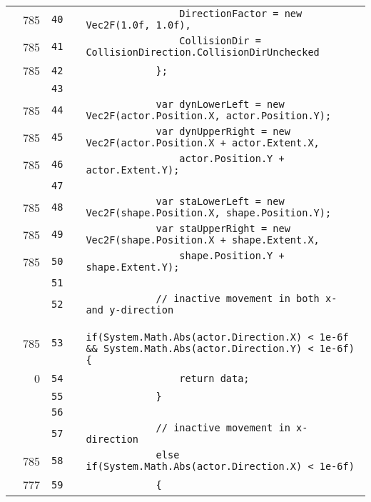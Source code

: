 \documentclass[a4paper,landscape,10pt]{article}
\begin{document}
\begin{longtable}[l]{lrrll}
\cellcolor{green} & 785 & \verb~40~ & & \verb~                DirectionFactor = new Vec2F(1.0f, 1.0f),~\\
\cellcolor{green} & 785 & \verb~41~ & & \verb~                CollisionDir = CollisionDirection.CollisionDirUnchecked~\\
\cellcolor{green} & 785 & \verb~42~ & & \verb~            };~\\
\cellcolor{gray} &  & \verb~43~ & & \verb~~\\
\cellcolor{green} & 785 & \verb~44~ & & \verb~            var dynLowerLeft = new Vec2F(actor.Position.X, actor.Position.Y);~\\
\cellcolor{green} & 785 & \verb~45~ & & \verb~            var dynUpperRight = new Vec2F(actor.Position.X + actor.Extent.X,~\\
\cellcolor{green} & 785 & \verb~46~ & & \verb~                actor.Position.Y + actor.Extent.Y);~\\
\cellcolor{gray} &  & \verb~47~ & & \verb~~\\
\cellcolor{green} & 785 & \verb~48~ & & \verb~            var staLowerLeft = new Vec2F(shape.Position.X, shape.Position.Y);~\\
\cellcolor{green} & 785 & \verb~49~ & & \verb~            var staUpperRight = new Vec2F(shape.Position.X + shape.Extent.X,~\\
\cellcolor{green} & 785 & \verb~50~ & & \verb~                shape.Position.Y + shape.Extent.Y);~\\
\cellcolor{gray} &  & \verb~51~ & & \verb~~\\
\cellcolor{gray} &  & \verb~52~ & & \verb~            // inactive movement in both x- and y-direction~\\
\cellcolor{orange} & 785 & \verb~53~ & & \verb~            if(System.Math.Abs(actor.Direction.X) < 1e-6f && System.Math.Abs(actor.Direction.Y) < 1e-6f) {~\\
\cellcolor{red} & 0 & \verb~54~ & & \verb~                return data;~\\
\cellcolor{gray} &  & \verb~55~ & & \verb~            }~\\
\cellcolor{gray} &  & \verb~56~ & & \verb~~\\
\cellcolor{gray} &  & \verb~57~ & & \verb~            // inactive movement in x-direction~\\
\cellcolor{green} & 785 & \verb~58~ & & \verb~            else if(System.Math.Abs(actor.Direction.X) < 1e-6f)~\\
\cellcolor{green} & 777 & \verb~59~ & & \verb~            {~\\

\end{longtable}
\end{document}
